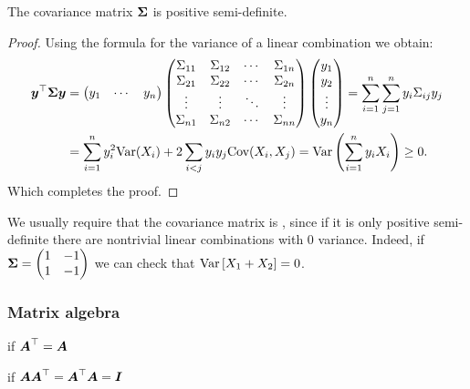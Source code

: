 \begin{proposition}
    The covariance matrix $\boldsymbol{\Sigma}$ is positive semi-definite.
\end{proposition}
\begin{proof}
    Using the formula for the variance of a linear combination we obtain:
    \begin{align*}
        \boldsymbol{y}^\top \boldsymbol{\Sigma} \boldsymbol{y} 
        &= 
        \begin{pmatrix}
        y_1 & \cdots & y_n
        \end{pmatrix}
        \begin{pmatrix}
        \Sigma_{11} & \Sigma_{12} & \cdots & \Sigma_{1n} \\
        \Sigma_{21} & \Sigma_{22} & \cdots & \Sigma_{2n} \\
        \vdots & \vdots & \ddots & \vdots \\
        \Sigma_{n1} & \Sigma_{n2} & \cdots & \Sigma_{nn}
        \end{pmatrix}
        \begin{pmatrix}
        y_1 \\
        y_2 \\
        \vdots \\
        y_n
        \end{pmatrix}
        = \sum_{i=1}^{n} \sum_{j=1}^{n} y_i \Sigma_{ij} y_j
        \\&= \sum_{i=1}^{n} y_i^2 \text{Var}(X_i) + 2 \sum_{i < j} y_i y_j \text{Cov}(X_i, X_j)
        = \text{Var}\left( \sum_{i=1}^{n} y_i X_i \right)
        \geq 0. 
    \end{align*}
    Which completes the proof.
\end{proof}
We usually require that the covariance matrix is , since if it is only positive semi-definite there are nontrivial linear combinations with 0 variance. Indeed, if 
$\boldsymbol{\Sigma}=\begin{pmatrix}
    1 & -1 \\ 1 & -1
\end{pmatrix}$
we can check that $\mathrm{Var}\left[X_1+X_2\right]=0$.

\subsubsection{Matrix algebra}

 if $\boldsymbol{A}^\top=\boldsymbol{A}$

 if $\boldsymbol{A}\boldsymbol{A}^\top=\boldsymbol{A}^\top\boldsymbol{A}=\boldsymbol{I}$

